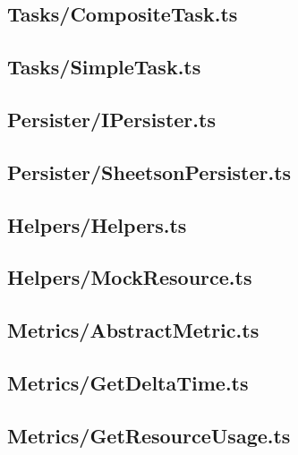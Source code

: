 \documentclass[12pt]{tcc}
\begin{document}
\subsection{Tasks/CompositeTask.ts}


\subsection{Tasks/SimpleTask.ts}


\subsection{Persister/IPersister.ts}


\subsection{Persister/SheetsonPersister.ts}


\subsection{Helpers/Helpers.ts}


\subsection{Helpers/MockResource.ts}


\subsection{Metrics/AbstractMetric.ts}


\subsection{Metrics/GetDeltaTime.ts}


\subsection{Metrics/GetResourceUsage.ts}


\label{bibpage}
\renewcommand\bibname{Referências}

%

\label{bibfinalpage}

\label{lastpage}
\end{document}
